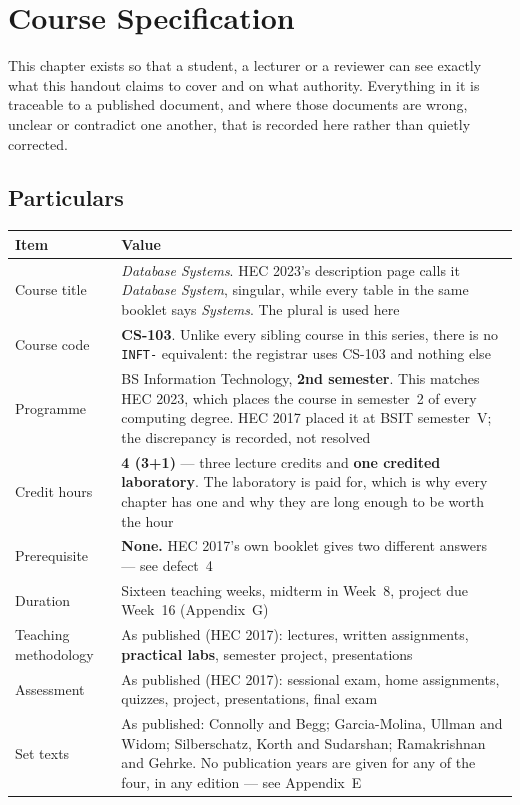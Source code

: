 \newpage

\chapter*{Course Specification}

This chapter exists so that a student, a lecturer or a reviewer can see
exactly what this handout claims to cover and on what authority. Everything in
it is traceable to a published document, and where those documents are wrong,
unclear or contradict one another, that is recorded here rather than quietly
corrected.

\section*{Particulars}

\begin{longtable}{@{}L{3.6cm}L{11.0cm}@{}}
\toprule
{}
\textbf{Item} & \textbf{Value} \\
\midrule
\endhead
Course title & \emph{Database Systems}. HEC 2023's description page calls it
\emph{Database System}, singular, while every table in the same booklet says
\emph{Systems}. The plural is used here \\
Course code & \textbf{CS-103}. Unlike every sibling course in this series,
there is no \texttt{INFT-} equivalent: the registrar uses CS-103 and nothing
else \\
Programme & BS Information Technology, \textbf{2nd semester}. This matches HEC
2023, which places the course in semester~2 of every computing degree. HEC
2017 placed it at BSIT semester~V; the discrepancy is recorded, not resolved \\
Credit hours & \textbf{4 (3+1)} --- three lecture credits and \textbf{one
credited laboratory}. The laboratory is paid for, which is why every chapter
has one and why they are long enough to be worth the hour \\
Prerequisite & \textbf{None.} HEC 2017's own booklet gives two different
answers --- see defect~4 \\
Duration & Sixteen teaching weeks, midterm in Week~8, project due Week~16
(Appendix~G) \\
Teaching methodology & As published (HEC 2017): lectures, written assignments,
\textbf{practical labs}, semester project, presentations \\
Assessment & As published (HEC 2017): sessional exam, home assignments,
quizzes, project, presentations, final exam \\
Set texts & As published: Connolly and Begg; Garcia-Molina, Ullman and Widom;
Silberschatz, Korth and Sudarshan; Ramakrishnan and Gehrke. No publication
years are given for any of the four, in any edition --- see Appendix~E \\
\bottomrule
\end{longtable}

